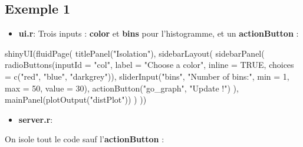 \documentclass[
]{article}
\newenvironment{Shaded}{\begin{snugshade}}{\end{snugshade}}
\newcommand{\AttributeTok}[1]{\textcolor[rgb]{0.77,0.63,0.00}{#1}}
\newcommand{\ConstantTok}[1]{\textcolor[rgb]{0.00,0.00,0.00}{#1}}
\newcommand{\DecValTok}[1]{\textcolor[rgb]{0.00,0.00,0.81}{#1}}
\newcommand{\FunctionTok}[1]{\textcolor[rgb]{0.00,0.00,0.00}{#1}}
\newcommand{\NormalTok}[1]{#1}
\newcommand{\StringTok}[1]{\textcolor[rgb]{0.31,0.60,0.02}{#1}}
\providecommand{\tightlist}{%
  \setlength{\itemsep}{0pt}\setlength{\parskip}{0pt}}
\begin{document}
\hypertarget{exemple-1}{%
\subsection{Exemple 1}\label{exemple-1}}

\begin{itemize}
\tightlist
\item
  \textbf{ui.r}: Trois inputs : \textbf{color} et \textbf{bins} pour
  l'histogramme, et un \textbf{actionButton} :
\end{itemize}

\begin{Shaded}
\begin{Highlighting}[]
\FunctionTok{shinyUI}\NormalTok{(}\FunctionTok{fluidPage}\NormalTok{(}
  \FunctionTok{titlePanel}\NormalTok{(}\StringTok{"Isolation"}\NormalTok{),}
  \FunctionTok{sidebarLayout}\NormalTok{(}
    \FunctionTok{sidebarPanel}\NormalTok{(}
      \FunctionTok{radioButtons}\NormalTok{(}\AttributeTok{inputId =} \StringTok{"col"}\NormalTok{, }\AttributeTok{label =} \StringTok{"Choose a color"}\NormalTok{, }\AttributeTok{inline =} \ConstantTok{TRUE}\NormalTok{,}
                   \AttributeTok{choices =} \FunctionTok{c}\NormalTok{(}\StringTok{"red"}\NormalTok{, }\StringTok{"blue"}\NormalTok{, }\StringTok{"darkgrey"}\NormalTok{)),}
      \FunctionTok{sliderInput}\NormalTok{(}\StringTok{"bins"}\NormalTok{, }\StringTok{"Number of bins:"}\NormalTok{, }\AttributeTok{min =} \DecValTok{1}\NormalTok{, }\AttributeTok{max =} \DecValTok{50}\NormalTok{, }\AttributeTok{value =} \DecValTok{30}\NormalTok{),}
      \FunctionTok{actionButton}\NormalTok{(}\StringTok{"go\_graph"}\NormalTok{, }\StringTok{"Update !"}\NormalTok{)}
\NormalTok{    ),}
    \FunctionTok{mainPanel}\NormalTok{(}\FunctionTok{plotOutput}\NormalTok{(}\StringTok{"distPlot"}\NormalTok{))}
\NormalTok{  )}
\NormalTok{))}
\end{Highlighting}
\end{Shaded}

\begin{itemize}
\tightlist
\item
  \textbf{server.r}:
\end{itemize}

On isole tout le code sauf l'\textbf{actionButton} :
\end{document}
